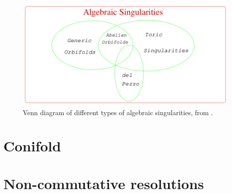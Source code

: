     \begin{figure}[H]
        \centering
        \includegraphics[scale=0.3]{Pictures/algebraicsingularities.png}
        \caption{Venn diagram of different types of algebraic singularities, from \cite{he2004lectures}.}
    \end{figure}

\section{Conifold}

\section{Non-commutative resolutions}

